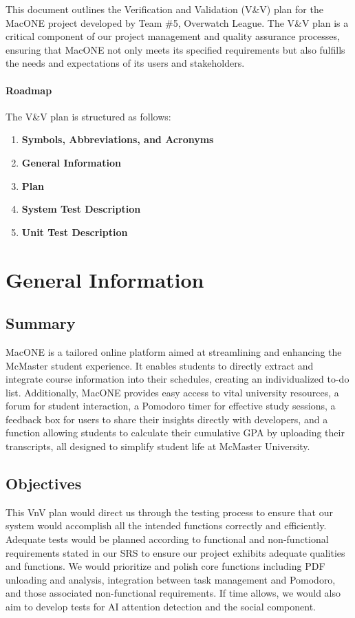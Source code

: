 \documentclass[12pt, titlepage]{article}
\begin{document}

This document outlines the Verification and Validation (V\&V) plan for the MacONE project developed by Team \#5, Overwatch League. The V\&V plan is a critical component of our project management and quality assurance processes, ensuring that MacONE not only meets its specified requirements but also fulfills the needs and expectations of its users and stakeholders.

\paragraph{Roadmap}
The V\&V plan is structured as follows:
\begin{enumerate}
    \item \textbf{Symbols, Abbreviations, and Acronyms}
    \item \textbf{General Information}
    \item \textbf{Plan} 
    \item \textbf{System Test Description} 
    \item \textbf{Unit Test Description}
\end{enumerate}
\section{General Information}

\subsection{Summary}
MacONE is a tailored online platform aimed at streamlining and enhancing
the McMaster student experience. It enables students to directly extract and
integrate course information into their schedules, creating an individualized
to-do list. Additionally, MacONE provides easy access to vital university
resources, a forum for student interaction, a Pomodoro timer for effective
study sessions, a feedback box for users to share their insights directly with
developers, and a function allowing students to calculate their cumulative
GPA by uploading their transcripts, all designed to simplify student life at
McMaster University.


\subsection{Objectives}
This VnV plan would direct us through the testing process to ensure that our system would accomplish all the intended functions correctly and efficiently.  
Adequate tests would be planned according to functional and non-functional requirements stated in our SRS to ensure our project exhibits adequate qualities and functions.
We would prioritize and polish core functions including PDF unloading and analysis, integration between task management and Pomodoro, and those associated non-functional requirements. If time allows, we would also aim to develop tests for AI attention detection and the social component.
\end{document}
